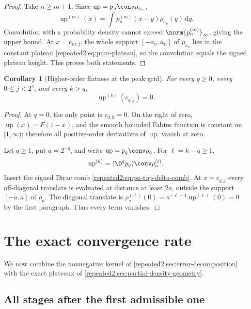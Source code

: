 \documentclass[11pt,oneside]{article}
\newtheorem{corollary}[corollary]{Corollary}
\theoremstyle{definition}
\theoremstyle{remark}
\newcommand{\Up}{\operatorname{up}}
\newcommand{\dd}{\,\mathrm d}
\begin{document}
\begin{proof}
Take $n\ge m+1$.  Since $\Up=p_n\conv\rho_{a_n}$,
\[
 \Up^{(m)}(x)=\int p_n^{(m)}(x-y)\rho_{a_n}(y)\dd y.
\]
Convolution with a probability density cannot exceed
$\norm{p_n^{(m)}}_\infty$, giving the upper bound.  At $x=c_{m,j}$, the whole support
$[-a_n,a_n]$ of $\rho_{a_n}$ lies in the constant plateau
\eqref{repeated2:eq:pnm-plateau}, so the convolution equals the signed plateau height.  This proves
both statements.
\end{proof}

\begin{corollary}[Higher-order flatness at the peak grid]
\label{repeated2:cor:higher-flatness-grid}
For every $q\ge0$, every $0\le j<2^q$, and every $k>q$,
\begin{equation}
 \Up^{(k)}(c_{q,j})=0.
 \label{repeated2:eq:higher-flatness-grid}
\end{equation}
\end{corollary}

\begin{proof}
At $q=0$, the only point is $c_{0,0}=0$.  On the right of zero,
$\Up(x)=F(1-x)$, and the smooth bounded Fabius function is constant on $[1,\infty)$;
therefore all positive-order derivatives of $\Up$ vanish at zero.

Let $q\ge1$, put $a=2^{-q}$, and write $\Up=p_q\conv\rho_a$.  For
$\ell=k-q\ge1$,
\[
 \Up^{(k)}=(\D^q p_q)\conv\rho_a^{(\ell)}.
\]
Insert the signed Dirac comb \eqref{repeated2:eq:pn-top-delta-comb}.  At $x=c_{q,j}$ every
off-diagonal translate is evaluated at distance at least $2a$, outside the support
$[-a,a]$ of $\rho_a$.  The diagonal translate is
$\rho_a^{(\ell)}(0)=a^{-\ell-1}\Up^{(\ell)}(0)=0$ by the first paragraph.
Thus every term vanishes.
\end{proof}

\section{The exact convergence rate}
\label{repeated2:sec:exact-rate}

We now combine the nonnegative kernel of \cref{repeated2:sec:error-decomposition} with the exact
plateaux of \cref{repeated2:sec:partial-density-geometry}.

\subsection{All stages after the first admissible one}
\end{document}
